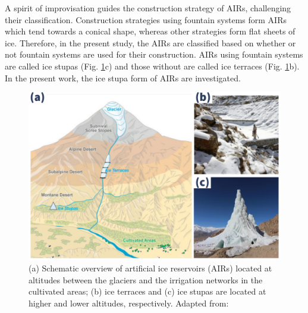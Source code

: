 \documentclass[tc, manuscript]{copernicus}
\begin{document}
A spirit of improvisation guides the construction strategy of AIRs, challenging their classification.
Construction strategies using fountain systems form AIRs which tend towards a conical shape, whereas other
strategies form flat sheets of ice. Therefore, in the present study, the AIRs are classified based on whether or
not fountain systems are used for their construction. AIRs using fountain systems are called ice stupas (Fig.
\ref{fig:AIRforms}c) and those without are called ice terraces (Fig. \ref{fig:AIRforms}b). In the present work,
the ice stupa form of AIRs are investigated.

\begin{figure}[htb]
\includegraphics[width=12cm]{Figures/AIR_forms.jpg}

\caption{(a) Schematic overview of artificial ice reservoirs (AIRs) located at
altitudes between the glaciers and the irrigation networks in the cultivated areas; (b) ice terraces and (c) ice
stupas are located at higher and lower altitudes, respectively. Adapted from:
\cite{nusserLocalKnowledgeGlobal2016}}

\label{fig:AIRforms}
\end{figure}
\end{document}
